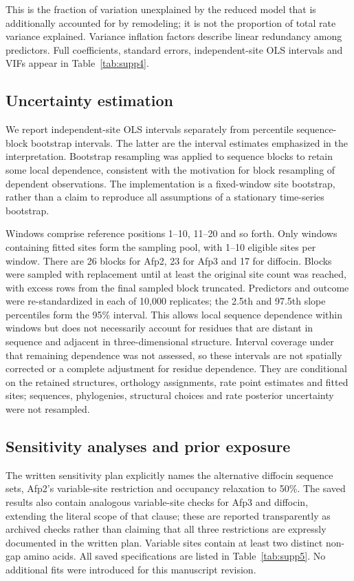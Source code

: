 \documentclass[11pt,a4paper]{article}
\begin{document}
This is the fraction of variation unexplained by the reduced model that is additionally accounted for by remodeling; it is not the proportion of total rate variance explained. Variance inflation factors describe linear redundancy among predictors. Full coefficients, standard errors, independent-site OLS intervals and VIFs appear in Table~\ref{tab:supp4}.

\subsection{Uncertainty estimation}

We report independent-site OLS intervals separately from percentile sequence-block bootstrap intervals. The latter are the interval estimates emphasized in the interpretation. Bootstrap resampling\cite{ref22} was applied to sequence blocks to retain some local dependence, consistent with the motivation for block resampling of dependent observations.\cite{ref23} The implementation is a fixed-window site bootstrap, rather than a claim to reproduce all assumptions of a stationary time-series bootstrap.

Windows comprise reference positions 1--10, 11--20 and so forth. Only windows containing fitted sites form the sampling pool, with 1--10 eligible sites per window. There are 26 blocks for Afp2, 23 for Afp3 and 17 for diffocin. Blocks were sampled with replacement until at least the original site count was reached, with excess rows from the final sampled block truncated. Predictors and outcome were re-standardized in each of 10,000 replicates; the 2.5th and 97.5th slope percentiles form the 95\% interval. This allows local sequence dependence within windows but does not necessarily account for residues that are distant in sequence and adjacent in three-dimensional structure. Interval coverage under that remaining dependence was not assessed, so these intervals are not spatially corrected or a complete adjustment for residue dependence. They are conditional on the retained structures, orthology assignments, rate point estimates and fitted sites; sequences, phylogenies, structural choices and rate posterior uncertainty were not resampled.

\subsection{Sensitivity analyses and prior exposure}

The written sensitivity plan explicitly names the alternative diffocin sequence sets, Afp2's variable-site restriction and occupancy relaxation to 50\%. The saved results also contain analogous variable-site checks for Afp3 and diffocin, extending the literal scope of that clause; these are reported transparently as archived checks rather than claiming that all three restrictions are expressly documented in the written plan. Variable sites contain at least two distinct non-gap amino acids. All saved specifications are listed in Table~\ref{tab:supp5}. No additional fits were introduced for this manuscript revision.
\end{document}
